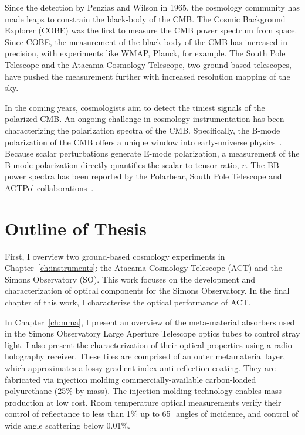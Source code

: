 Since the detection by Penzias and Wilson in 1965, the cosmology community has made leaps to constrain the black-body of the CMB.  The Cosmic Background Explorer (COBE) was the first to measure the CMB power spectrum from space.  Since COBE, the measurement of the black-body of the CMB has increased in precision, with experiments like WMAP, Planck, for example.  The South Pole Telescope and the Atacama Cosmology Telescope, two ground-based telescopes, have pushed the measurement further with increased resolution mapping of the sky.

In the coming years, cosmologists aim to detect the tiniest signals of the polarized CMB.  An ongoing challenge in cosmology instrumentation has been characterizing the polarization spectra of the CMB.  Specifically, the B-mode polarization of the CMB offers a unique window into early-universe physics~\cite{weinberg_cosmo}.  Because scalar perturbations generate E-mode polarization, a measurement of the B-mode polarization directly quantifies the scalar-to-tensor ratio, $r$.  The BB-power spectra has been reported by the Polarbear, South Pole Telescope and ACTPol collaborations~\cite{planck_data,choi_2020,PARAde_2014}.

\section{Outline of Thesis}

First, I overview two ground-based cosmology experiments in Chapter~\ref{ch:instruments}: the Atacama Cosmology Telescope (ACT) and the Simons Observatory (SO).  This work focuses on the development and characterization of optical components for the Simons Observatory.  In the final chapter of this work, I characterize the optical performance of ACT.

In Chapter~\ref{ch:mma}, I present an overview of the meta-material absorbers used in the Simons Observatory Large Aperture Telescope optics tubes to control stray light.  I also present the characterization of their optical properties using a radio holography receiver.  These tiles are comprised of an outer metamaterial layer, which approximates a lossy gradient index anti-reflection coating. They are fabricated via injection molding commercially-available carbon-loaded polyurethane (25\% by mass). The injection molding technology enables mass production at low cost.  Room temperature optical measurements verify their control of reflectance to less than 1\% up to 65$^{\circ}$ angles of incidence, and control of wide angle scattering below 0.01\%.

